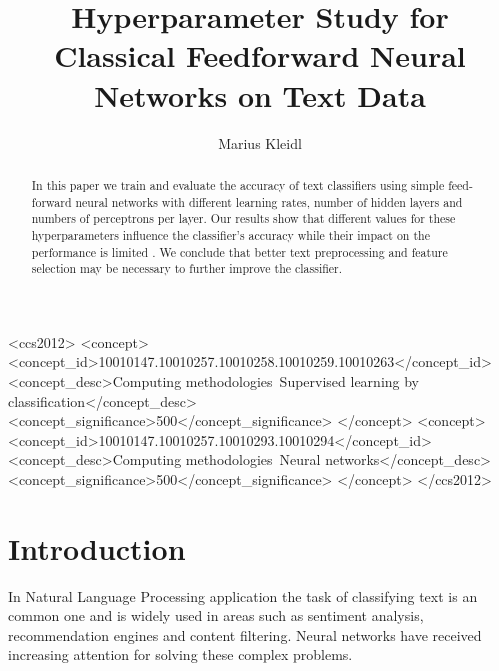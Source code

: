 \documentclass[sigconf]{acmart}
\begin{document}
\title{Hyperparameter Study for Classical Feedforward Neural Networks on Text Data}

\author{Marius Kleidl}


\renewcommand{\shortauthors}{B. Trovato et al.}


\begin{abstract}
	In this paper we train and evaluate the accuracy of text classifiers using simple feed-forward neural networks with different learning rates, number of hidden layers and numbers of perceptrons per layer. Our results show that different values for these hyperparameters influence the classifier's accuracy while their impact on the performance is limited . We conclude that better text preprocessing and feature selection may be necessary to further improve the classifier.
\end{abstract}

%
%
\begin{CCSXML}
	<ccs2012>
	<concept>
	<concept_id>10010147.10010257.10010258.10010259.10010263</concept_id>
	<concept_desc>Computing methodologies~Supervised learning by classification</concept_desc>
	<concept_significance>500</concept_significance>
	</concept>
	<concept>
	<concept_id>10010147.10010257.10010293.10010294</concept_id>
	<concept_desc>Computing methodologies~Neural networks</concept_desc>
	<concept_significance>500</concept_significance>
	</concept>
	</ccs2012>
\end{CCSXML}



\maketitle

\section{Introduction}

In Natural Language Processing application the task of classifying text is an common one and is widely used in areas such as sentiment analysis, recommendation engines and content filtering. Neural networks have received increasing attention for solving these complex problems. 
\end{document}
